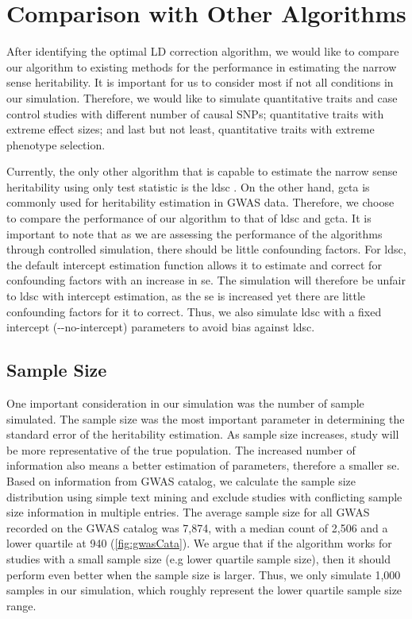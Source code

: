 		\section{Comparison with Other Algorithms}
		After identifying the optimal \gls{LD} correction algorithm, we would like to compare our algorithm to existing methods for the performance in estimating the narrow sense heritability.
		It is important for us to consider most if not all conditions in our simulation. 
		Therefore, we would like to simulate quantitative traits and case control studies with different number of causal \glspl{SNP}; quantitative traits with extreme effect sizes; and last but not least, quantitative traits with extreme phenotype selection.
		
		Currently, the only other algorithm that is capable to estimate the narrow sense heritability using only test statistic is the \gls{ldsc} \citep{Bulik-Sullivan2015}. 
		On the other hand, \gls{gcta} \citep{Yang2011} is commonly used for heritability estimation in \gls{GWAS} data. 
		Therefore, we choose to compare the performance of our algorithm to that of \gls{ldsc} and \gls{gcta}.
		It is important to note that as we are assessing the performance of the algorithms through controlled simulation, there should be little confounding factors. 
		For \gls{ldsc}, the default intercept estimation function allows it to estimate and correct for confounding factors with an increase in \gls{se}. 
		The simulation will therefore be unfair to \gls{ldsc} with intercept estimation, as the \gls{se} is increased yet there are little confounding factors for it to correct.
		Thus, we also simulate \gls{ldsc} with a fixed intercept (-{}-no-intercept) parameters to avoid bias against \gls{ldsc}.	
		
		\subsection{Sample Size}
			One important consideration in our simulation was the number of sample simulated. 
			The sample size was the most important parameter in determining the standard error of the heritability estimation. 
			As sample size increases, study will be more representative of the true population. 
			The increased number of information also means a better estimation of parameters, therefore a smaller \acrfull{se}.
			Based on information from \gls{GWAS} catalog\citep{Welter2014}, we calculate the sample size distribution using simple text mining and exclude studies with conflicting sample size information in multiple entries. 
			The average sample size for all \gls{GWAS} recorded on the \gls{GWAS} catalog was 7,874, with a median count of 2,506 and a lower quartile at 940 (\cref{fig:gwasCata}). 
			We argue that if the algorithm works for studies with a small sample size (e.g lower quartile sample size), then it should perform even better when the sample size is larger. 
			Thus, we only simulate 1,000 samples in our simulation, which roughly represent the lower quartile sample size range.
				
